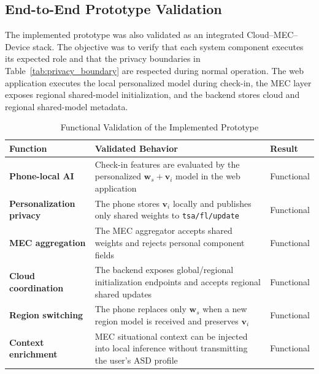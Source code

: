 \documentclass[lettersize,journal]{IEEEtran}
\begin{document}
\subsection{End-to-End Prototype Validation}

The implemented prototype was also validated as an integrated
Cloud--MEC--Device stack. The objective was to verify that each system
component executes its expected role and that the privacy boundaries in
Table~\ref{tab:privacy_boundary} are respected during normal operation.
The web application executes the local personalized model during
check-in, the MEC layer exposes regional shared-model initialization,
and the backend stores cloud and regional shared-model metadata.

\begin{table}[!t]
    \centering
    \caption{Functional Validation of the Implemented Prototype\label{tab:functional_validation}}
    \scriptsize
    \renewcommand{\arraystretch}{1.2}
    \begin{tabularx}{\columnwidth}{
        >{\raggedright\bfseries}p{2.0cm}
        >{\raggedright}X
        >{\raggedright\arraybackslash}p{1.7cm}}
        \toprule
        \rowcolor{gray!15}
        \textbf{Function} & \textbf{Validated Behavior} & \textbf{Result} \\
        \midrule
        Phone-local AI &
        Check-in features are evaluated by the personalized
        $\mathbf{w}_s+\mathbf{v}_i$ model in the web application &
        Functional \\
        \midrule
        Personalization privacy &
        The phone stores $\mathbf{v}_i$ locally and publishes only
        shared weights to \texttt{tsa/fl/update} &
        Functional \\
        \midrule
        MEC aggregation &
        The MEC aggregator accepts shared weights and rejects personal
        component fields &
        Functional \\
        \midrule
        Cloud coordination &
        The backend exposes global/regional initialization endpoints and
        accepts regional shared updates &
        Functional \\
        \midrule
        Region switching &
        The phone replaces only $\mathbf{w}_s$ when a new region model
        is received and preserves $\mathbf{v}_i$ &
        Functional \\
        \midrule
        Context enrichment &
        MEC situational context can be injected into local inference
        without transmitting the user's ASD profile &
        Functional \\
        \bottomrule
    \end{tabularx}
\end{table}
\end{document}
